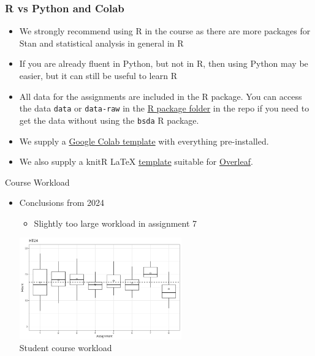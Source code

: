 \documentclass[10pt]{beamer}
\begin{document}
\begin{frame}
  \frametitle{R vs Python and Colab}

  \begin{itemize}
    \item We strongly recommend using R in the course as there are more
    packages for Stan and statistical analysis in general in R\pause
    \item If you are already fluent in Python, but not in R, then using Python may be easier, but it can still be useful to learn R\pause
    \item All data for the assignments are included in the R package. You can access the data \texttt{data} or \texttt{data-raw} in the \href{https://github.com/MansMeg/BSDA/blob/main/rpackage/}{R package folder} in the repo if you need to get the data without using the \texttt{bsda} R package.\pause
    \item We supply a \href{https://github.com/MansMeg/BSDA/blob/main/templates/bsda_colab_template.ipynb}{Google Colab template} with everything pre-installed.
    \pause
    \item We also supply a knitR \LaTeX{} \href{https://github.com/MansMeg/BSDA/blob/main/templates/assignment_template.Rtex}{template} suitable for \href{https://www.overleaf.com/}{Overleaf}.
  \end{itemize}

\end{frame}

\begin{frame}{Course Workload}

\begin{itemize}
  \item Conclusions from 2024
  \begin{itemize}
  \item Slightly too large workload in assignment 7
  \end{itemize}
  \center
  \vspace{\baselineskip}
  \includegraphics[width=7cm]{figs/time_spent.png}\\
  Student course workload
\end{itemize}

\end{frame}
\end{document}
